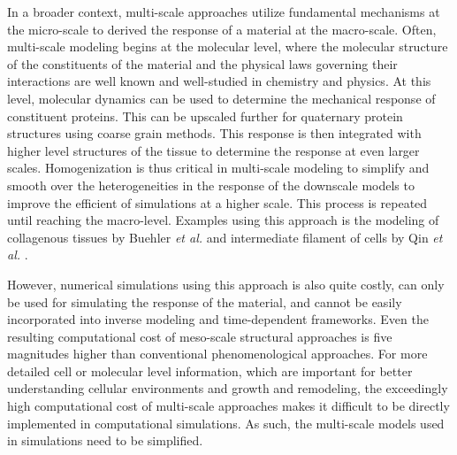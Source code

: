     In a broader context, multi-scale approaches utilize fundamental mechanisms at the micro-scale to derived the response of a material at the macro-scale. Often, multi-scale modeling begins at the molecular level, where the molecular structure of the constituents of the material and the physical laws governing their interactions are well known and well-studied in chemistry and physics. At this level, molecular dynamics can be used to determine the mechanical response of constituent proteins. This can be upscaled further for quaternary protein structures using coarse grain methods. This response is then integrated with higher level structures of the tissue to determine the response at even larger scales. Homogenization is thus critical in multi-scale modeling to simplify and smooth over the heterogeneities in the response of the downscale models to improve the efficient of simulations at a higher scale. This process is repeated until reaching the macro-level. Examples using this approach is the modeling of collagenous tissues by Buehler \textit{et al.} \cite{buehler_atomistic_2006, buehler_nanomechanics_2008} and intermediate filament of cells by Qin \textit{et al.} \cite{qin_multi_2010}. 
    
    
    However, numerical simulations using this approach is also quite costly, can only be used for simulating the response of the material, and cannot be easily incorporated into inverse modeling and time-dependent frameworks. Even the resulting computational cost of meso-scale structural approaches is five magnitudes higher than conventional phenomenological approaches. For more detailed cell or molecular level information, which are important for better understanding cellular environments and growth and remodeling, the exceedingly high computational cost of multi-scale approaches makes it difficult to be directly implemented in computational simulations. As such, the multi-scale models used in simulations need to be simplified.

